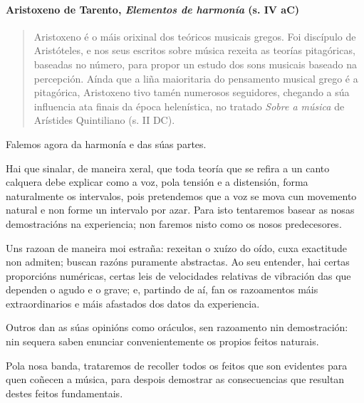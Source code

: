 
\paragraph{\texorpdfstring{Aristoxeno de Tarento, \emph{Elementos de
harmonía} (s. IV
aC)}{Aristoxeno de Tarento, Elementos de harmonía (s. IV aC)}}\label{aristoxeno-de-tarento--elementos-de-harmonuxeda--s.-iv-ac}

\begin{quote}
Aristoxeno é o máis orixinal dos teóricos musicais gregos. Foi discípulo de Aristóteles, e nos seus escritos sobre música rexeita as teorías pitagóricas, baseadas no número, para propor un estudo dos sons musicais baseado na percepción. Aínda que a liña maioritaria do pensamento musical grego é a pitagórica, Aristoxeno tivo tamén numerosos seguidores, chegando a súa influencia ata finais da época helenística, no tratado \emph{Sobre a música} de Arístides Quintiliano (s. II DC).
\end{quote}


\begin{multicols}{3}
\setlength{\columnseprule}{1pt}
{\small
\noindent
Falemos agora da harmonía e das súas partes.

\noindent
Hai que sinalar, de maneira xeral, que toda teoría que se refira a un canto calquera debe explicar como a voz, pola tensión e a distensión, forma naturalmente os intervalos, pois pretendemos que a voz se mova cun movemento natural e non forme un intervalo por azar. Para isto tentaremos basear as nosas demostracións na experiencia; non faremos nisto como os nosos predecesores.

\noindent
Uns razoan de maneira moi estraña: rexeitan o xuízo do oído, cuxa exactitude non admiten; buscan razóns puramente abstractas. Ao seu entender, hai certas proporcións numéricas, certas leis de velocidades relativas de vibración das que dependen o agudo e o grave; e, partindo de aí, fan os razoamentos máis extraordinarios e máis afastados dos datos da experiencia.

\noindent
Outros dan as súas opinións como oráculos, sen razoamento nin demostración: nin sequera saben enunciar convenientemente os propios feitos naturais.

\noindent
Pola nosa banda, trataremos de recoller todos os feitos que son evidentes para quen coñecen a música, para despois demostrar as consecuencias que resultan destes feitos fundamentais.
}
\end{multicols}


